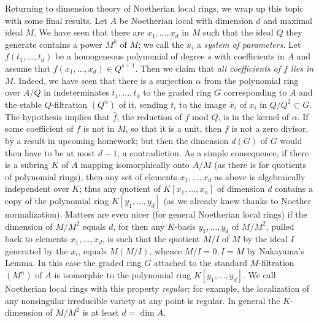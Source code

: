 \documentclass[10pt]{article}
\begin{document}
Returning to dimension theory of Noetherian local rings, we wrap up this
topic with some final results. Let $A$ be Noetherian local with
dimension $d$ and maximal ideal $M$, We have seen that there are
$x_1,\ldots,x_d$ in $M$ such that the ideal $Q$ they generate contains a
power $M^k$ of $M$; we call the $x_i$ a {\sl system of parameters}. Let
$f(t_1,\ldots,t_d)$ be a homogeneous polynomial of degree $s$ with
coefficients in $A$ and assume that $f(x_1,\ldots,x_d)\in Q^{s+1}$. Then
we claim that {\sl all coefficients of $f$ lies in $M$}. Indeed, we have
seen that there is a surjection $\alpha$ from the polynomial ring over
$A/Q$ in indeterminates $t_1,\ldots,t_d$ to the graded ring $G$
corresponding to $A$ and the stable $Q$-filtration $(Q^n)$ of it,
sending $t_i$ to the image $\bar{x}_i$ of $x_i$ in $Q/Q^2\subset G$. The
hypothesis implies that $\bar{f}$, the reduction of $f$ mod $Q$, is in
the kernel of $\alpha$. If some coefficient of $f$ is not in $M$, so
that it is a unit, then $f$ is not a zero divisor, by a result in
upcoming homework; but then the dimension $d(G)$ of $G$ would then have
to be at most $d-1$, a contradiction. As a simple consequence, if there
is a subring $K$ of $A$ mapping isomorphically onto $A/M$ (as there is
for quotients of polynomial rings), then any set of elements
$x_1,\ldots,x_d$ as above is algebraically independent over $K$; thus
any quotient of $K[x_1,\ldots,x_n]$ of dimension $d$ contains a copy of
the polynomial ring $K[y_1,\ldots,y_d]$ (as we already knew thanks to
Noether normalization). Matters are even nicer (for general Noetherian
local rings) if the dimension of $M/M^2$ equals $d$, for then any
$K$-basis $y_1,\ldots,y_d$ of $M/M^2$, pulled back to elements
$x_1,\ldots,x_d$, is such that the quotient $M/I$ of $M$ by the ideal
$I$ generated by the $x_i$, equals $M(M/I)$, whence $M/I = 0, I = M$ by
Nakayama's Lemma. In this case the graded ring $G$ attached to the
standard $M$-filtration $(M^n)$ of $A$ is isomorphic to the polynomial
ring $K[y_1,\ldots,y_d]$. We call Noetherian local rings with this
property {\sl regular}; for example, the localization of any nonsingular
irreducible variety at any point is regular. In general the
$K$-dimension of $M/M^2$ is at least $d=\dim A$.
\end{document}
